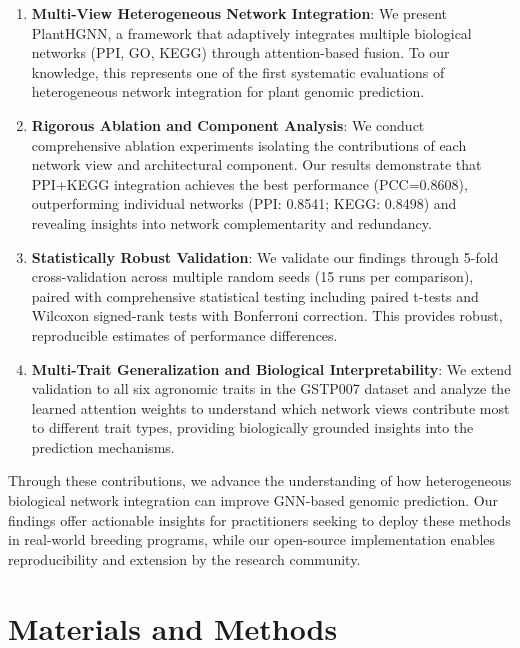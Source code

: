 \documentclass[11pt,a4paper]{article}
\begin{document}
\begin{enumerate}
    \item \textbf{Multi-View Heterogeneous Network Integration}: We present PlantHGNN, a framework that adaptively integrates multiple biological networks (PPI, GO, KEGG) through attention-based fusion. To our knowledge, this represents one of the first systematic evaluations of heterogeneous network integration for plant genomic prediction.

    \item \textbf{Rigorous Ablation and Component Analysis}: We conduct comprehensive ablation experiments isolating the contributions of each network view and architectural component. Our results demonstrate that PPI+KEGG integration achieves the best performance (PCC=0.8608), outperforming individual networks (PPI: 0.8541; KEGG: 0.8498) and revealing insights into network complementarity and redundancy.

    \item \textbf{Statistically Robust Validation}: We validate our findings through 5-fold cross-validation across multiple random seeds (15 runs per comparison), paired with comprehensive statistical testing including paired t-tests and Wilcoxon signed-rank tests with Bonferroni correction. This provides robust, reproducible estimates of performance differences.

    \item \textbf{Multi-Trait Generalization and Biological Interpretability}: We extend validation to all six agronomic traits in the GSTP007 dataset and analyze the learned attention weights to understand which network views contribute most to different trait types, providing biologically grounded insights into the prediction mechanisms.
\end{enumerate}

Through these contributions, we advance the understanding of how heterogeneous biological network integration can improve GNN-based genomic prediction. Our findings offer actionable insights for practitioners seeking to deploy these methods in real-world breeding programs, while our open-source implementation enables reproducibility and extension by the research community.


\section{Materials and Methods}
\label{sec:methods}
\end{document}
